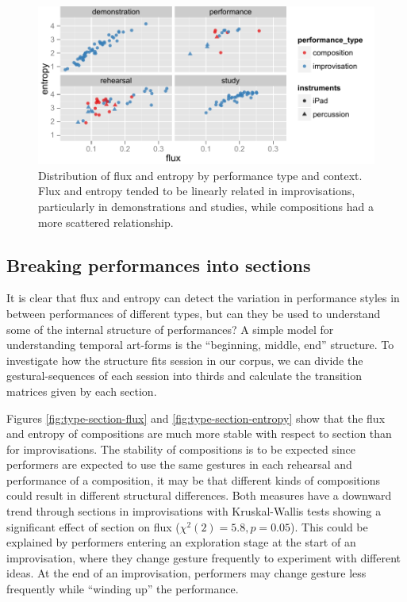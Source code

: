 \documentclass{sigchi}
\begin{document}
\begin{figure}
  \centering
  \includegraphics[width=\linewidth]{figures/flux-entropy-distribution}
  \caption{Distribution of flux and entropy by performance type and
    context. Flux and entropy tended to be linearly related in
    improvisations, particularly in demonstrations and studies, while
    compositions had a more scattered relationship.
    \label{fig:flux-entropy-distribution}}
\end{figure}


\subsection{Breaking performances into sections}

It is clear that flux and entropy can detect the variation in
performance styles in between performances of different types, but can
they be used to understand some of the internal structure of
performances? A simple model for understanding temporal art-forms is
the ``beginning, middle, end'' structure. To investigate how the
structure fits session in our corpus, we can divide the
gestural-sequences of each session into thirds and calculate the
transition matrices given by each section.

Figures \ref{fig:type-section-flux} and \ref{fig:type-section-entropy}
show that the flux and entropy of compositions are much more stable
with respect to section than for improvisations. The stability of
compositions is to be expected since performers are expected to use
the same gestures in each rehearsal and performance of a composition,
it may be that different kinds of compositions could result in
different structural differences. Both measures have a downward trend
through sections in improvisations with Kruskal-Wallis tests showing a
significant effect of section on flux ($\chi^2(2)=5.8, p=0.05$). This
could be explained by performers entering an exploration stage at the
start of an improvisation, where they change gesture frequently to
experiment with different ideas. At the end of an improvisation,
performers may change gesture less frequently while ``winding up'' the
performance.
\end{document}
